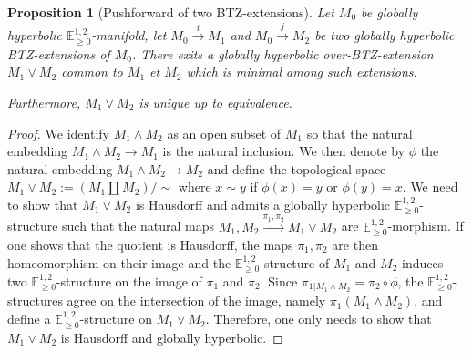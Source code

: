 \documentclass[a4paper,12pt]{article}
\newcommand{\mass}[1]{{\mathbb E}^{1,2}_{#1}}
\def\pgcd{M_1\wedge M_2}
\def\ppcm{M_1\vee M_2}
\newtheorem{propou}[lemou]{Proposition}
\begin{document}
		\begin{propou}[Pushforward of two BTZ-extensions] \label{prop:ppcm}Let $M_0$ be globally hyperbolic $\mass{\geq0}$-manifold, let $M_0\xrightarrow{i} M_1$ and $M_0 \xrightarrow{j} M_2$
			be two globally hyperbolic BTZ-extensions of $M_0$. There exits a globally hyperbolic over-BTZ-extension $\ppcm$ common to
			$M_1$ et $M_2$	which is minimal among such extensions.

			Furthermore, $\ppcm$ is unique up to equivalence.
	
		\end{propou}
		\begin{proof}
			
			We identify $\pgcd$ as an open subset of $M_1$ so that the natural embedding $\pgcd \rightarrow M_1$ is the natural inclusion. We then denote by $\phi$ the natural embedding $\pgcd \rightarrow M_2$ and define the topological space $\ppcm:= (M_1\coprod M_2)/\sim$ where $x\sim y$ if $\phi(x)=y$ or $\phi(y)=x$. We need to show that $\ppcm$ is Hausdorff and admits a globally hyperbolic $\mass{\geq0}$-structure such that the natural maps $M_1,M_2\xrightarrow{\pi_1,\pi_2} \ppcm$ are $\mass{\geq0}$-morphism. If one shows that the quotient is Hausdorff, the maps $\pi_1,\pi_2$ are then homeomorphism on their image and the $\mass{\geq0}$-structure of $M_1$ and $M_2$ induces two
$\mass{\geq0}$-structure on the image of $\pi_1$ and $\pi_2$. 	
Since $\pi_{1|\pgcd} = \pi_2\circ\phi$, the $\mass{\geq0}$-structures agree on the intersection of the image, namely $\pi_1(\pgcd)$, and define a $\mass{\geq0}$-structure on $\ppcm$. Therefore, one only needs to show that $\ppcm$ is Hausdorff and globally hyperbolic.
			

\end{proof}
\end{document}
